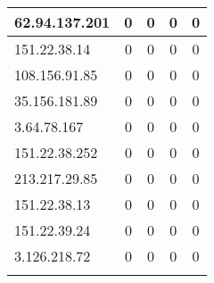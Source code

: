 \documentclass{article}
\begin{document}
\begin{longtable}{|>{\raggedright\arraybackslash}p{3cm}|c|c|c|c|}
    
    \rowcolor{lightgreen} %
    
    62.94.137.201 & 0 & 0 & 0 & 0 \\
    \hline
    
    
    \rowcolor{lightgreen} %
    
    151.22.38.14 & 0 & 0 & 0 & 0 \\
    \hline
    
    
    \rowcolor{lightgreen} %
    
    108.156.91.85 & 0 & 0 & 0 & 0 \\
    \hline
    
    
    \rowcolor{lightgreen} %
    
    35.156.181.89 & 0 & 0 & 0 & 0 \\
    \hline
    
    
    \rowcolor{lightgreen} %
    
    3.64.78.167 & 0 & 0 & 0 & 0 \\
    \hline
    
    
    \rowcolor{lightgreen} %
    
    151.22.38.252 & 0 & 0 & 0 & 0 \\
    \hline
    
    
    \rowcolor{lightgreen} %
    
    213.217.29.85 & 0 & 0 & 0 & 0 \\
    \hline
    
    
    \rowcolor{lightgreen} %
    
    151.22.38.13 & 0 & 0 & 0 & 0 \\
    \hline
    
    
    \rowcolor{lightgreen} %
    
    151.22.39.24 & 0 & 0 & 0 & 0 \\
    \hline
    
    
    \rowcolor{lightgreen} %
    
    3.126.218.72 & 0 & 0 & 0 & 0 \\
    \hline
    
    
    \rowcolor{lightgreen} %
    

\end{longtable}
\end{document}
